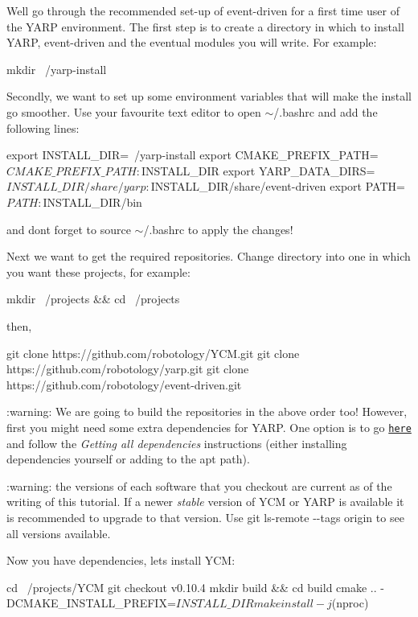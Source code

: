 We\textquotesingle{}ll go through the recommended set-\/up of {\ttfamily event-\/driven} for a first time user of the {\ttfamily Y\+A\+RP} environment. The first step is to create a directory in which to install {\ttfamily Y\+A\+RP}, {\ttfamily event-\/driven} and the eventual modules you will write. For example\+: 
\begin{DoxyCode}
mkdir ~/yarp-install
\end{DoxyCode}
 Secondly, we want to set up some environment variables that will make the install go smoother. Use your favourite text editor to open {\ttfamily $\sim$/.bashrc} and add the following lines\+: 
\begin{DoxyCode}
export INSTALL\_DIR=~/yarp-install
export CMAKE\_PREFIX\_PATH=$CMAKE\_PREFIX\_PATH:$INSTALL\_DIR
export YARP\_DATA\_DIRS=$INSTALL\_DIR/share/yarp:$INSTALL\_DIR/share/event-driven
export PATH=$PATH:$INSTALL\_DIR/bin
\end{DoxyCode}
 and don\textquotesingle{}t forget to {\ttfamily source $\sim$/.bashrc} to apply the changes!

Next we want to get the required repositories. Change directory into one in which you want these projects, for example\+: 
\begin{DoxyCode}
mkdir ~/projects && cd ~/projects
\end{DoxyCode}
 then, 
\begin{DoxyCode}
git clone https://github.com/robotology/YCM.git
git clone https://github.com/robotology/yarp.git
git clone https://github.com/robotology/event-driven.git
\end{DoxyCode}
 \+:warning\+: We are going to build the repositories in the above order too! However, first you might need some extra dependencies for {\ttfamily Y\+A\+RP}. One option is to go \href{http://wiki.icub.org/wiki/Linux:Installation_from_sources}{\tt here} and follow the {\itshape Getting all dependencies} instructions (either installing dependencies yourself or adding to the {\ttfamily apt} path).

\+:warning\+: the versions of each software that you checkout are current as of the writing of this tutorial. If a newer {\itshape stable} version of Y\+CM or Y\+A\+RP is available it is recommended to upgrade to that version. Use {\ttfamily git ls-\/remote -\/-\/tags origin} to see all versions available.

Now you have dependencies, let\textquotesingle{}s install {\ttfamily Y\+CM}\+: 
\begin{DoxyCode}
cd ~/projects/YCM
git checkout v0.10.4
mkdir build && cd build
cmake .. -DCMAKE\_INSTALL\_PREFIX=$INSTALL\_DIR
make install -j$(nproc)
\end{DoxyCode}


